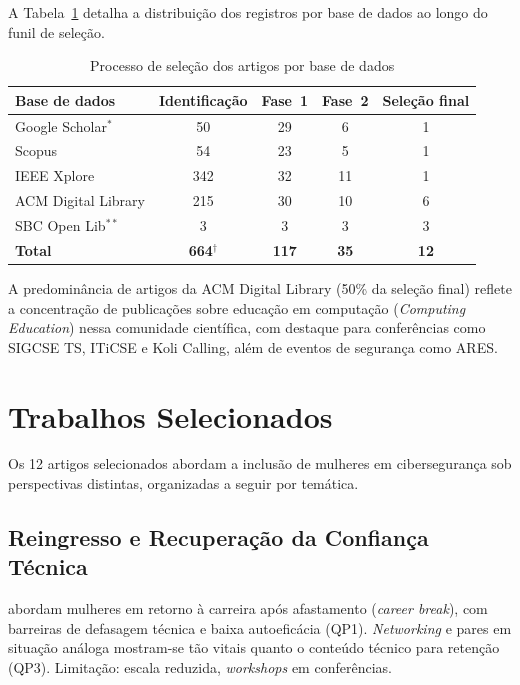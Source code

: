 \documentclass[12pt]{article}
\begin{document}
A Tabela~\ref{tab:selecao} detalha a distribuição dos registros por base de dados ao longo do funil de seleção.

\begin{table}[H]
\centering
\caption{Processo de seleção dos artigos por base de dados}
\label{tab:selecao}
\begin{tabular}{l|c|c|c|c}
\toprule
\textbf{Base de dados} & \textbf{Identificação} & \textbf{Fase~1} & \textbf{Fase~2} & \textbf{Seleção final} \\
\midrule
Google Scholar$^{*}$ & 50  & 29 & 6  & 1 \\
Scopus               & 54  & 23 & 5  & 1 \\
IEEE Xplore          & 342 & 32 & 11 & 1 \\
ACM Digital Library  & 215 & 30 & 10 & 6 \\
SBC Open Lib$^{**}$  & 3  &  3 &  3 & 3 \\
\midrule
\textbf{Total} & \textbf{664}$^{\dagger}$ & \textbf{117} & \textbf{35} & \textbf{12} \\
\bottomrule
\end{tabular}
\vspace{2pt}
\end{table}

A predominância de artigos da ACM Digital Library (50\% da seleção final) reflete a
concentração de publicações sobre educação em computação (\textit{Computing Education})
nessa comunidade científica, com destaque para conferências como SIGCSE TS, ITiCSE e Koli
Calling, além de eventos de segurança como ARES.


\section{Trabalhos Selecionados} \label{sec:resultados}

Os 12 artigos selecionados abordam a inclusão de mulheres em cibersegurança sob
perspectivas distintas, organizadas a seguir por temática.

\subsection{Reingresso e Recuperação da Confiança Técnica}

 abordam mulheres em retorno à carreira após afastamento (\textit{career break}), com barreiras de defasagem técnica e baixa autoeficácia (QP1). \textit{Networking} e pares em situação análoga mostram-se tão vitais quanto o conteúdo técnico para retenção (QP3). Limitação: escala reduzida, \textit{workshops} em conferências.
\end{document}
